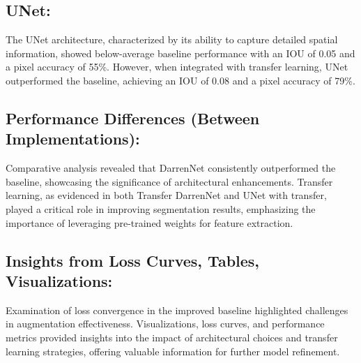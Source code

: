 \subsection*{UNet:}
The UNet architecture, characterized by its ability to capture detailed spatial information, showed below-average baseline performance with an IOU of 0.05 and a pixel accuracy of 55\%. However, when integrated with transfer learning, UNet outperformed the baseline, achieving an IOU of 0.08 and a pixel accuracy of 79\%.

\subsection*{Performance Differences (Between Implementations):}
Comparative analysis revealed that DarrenNet consistently outperformed the baseline, showcasing the significance of architectural enhancements. Transfer learning, as evidenced in both Transfer DarrenNet and UNet with transfer, played a critical role in improving segmentation results, emphasizing the importance of leveraging pre-trained weights for feature extraction.

\subsection*{Insights from Loss Curves, Tables, Visualizations:}
Examination of loss convergence in the improved baseline highlighted challenges in augmentation effectiveness. Visualizations, loss curves, and performance metrics provided insights into the impact of architectural choices and transfer learning strategies, offering valuable information for further model refinement.


%
%
%
%
%
%
